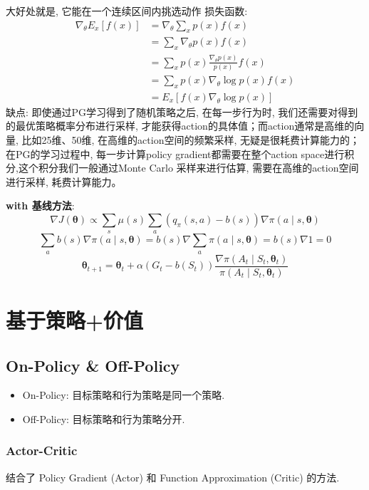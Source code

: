 \documentclass{article}
\begin{document}
        大好处就是, 它能在一个连续区间内挑选动作
        损失函数:
            \begin{align*}
                \nabla_{\theta} E_{x}[f(x)] &=\nabla_{\theta} \sum_{x} p(x) f(x) \\
                &=\sum_{x} \nabla_{\theta} p(x) f(x) \\
                &=\sum_{x} p(x) \frac{\nabla_{\theta} p(x)}{p(x)} f(x) \\
                &=\sum_{x} p(x) \nabla_{\theta} \log p(x) f(x) \\
                &=E_{x}\left[f(x) \nabla_{\theta} \log p(x)\right]
            \end{align*}
        缺点:
            即使通过PG学习得到了随机策略之后, 在每一步行为时, 我们还需要对得到的最优策略概率分布进行采样, 才能获得action的具体值；而action通常是高维的向量, 比如25维、50维, 在高维的action空间的频繁采样, 无疑是很耗费计算能力的；\\
            在PG的学习过程中, 每一步计算policy gradient都需要在整个action space进行积分,这个积分我们一般通过Monte Carlo 采样来进行估算, 需要在高维的action空间进行采样, 耗费计算能力。
            
        \textbf{with 基线方法}:
            $$\nabla J(\boldsymbol{\theta}) \propto \sum_{s} \mu(s) \sum_{a}\left(q_{\pi}(s, a)-b(s)\right) \nabla \pi(a \mid s, \boldsymbol{\theta})$$
            $$\sum_{a} b(s) \nabla \pi(a \mid s, \boldsymbol{\theta})=b(s) \nabla \sum_{a} \pi(a \mid s, \boldsymbol{\theta})=b(s) \nabla 1=0$$
            $$\boldsymbol{\theta}_{t+1} = \boldsymbol{\theta}_{t}+\alpha\left(G_{t}-b\left(S_{t}\right)\right) \frac{\nabla \pi\left(A_{t} \mid S_{t}, \boldsymbol{\theta}_{t}\right)}{\pi\left(A_{t} \mid S_{t}, \boldsymbol{\theta}_{t}\right)}$$


\section{基于策略+价值}
        \subsection{On-Policy \& Off-Policy}
            \begin{itemize}
                \item On-Policy: 目标策略和行为策略是同一个策略.
                \item Off-Policy: 目标策略和行为策略分开.
            \end{itemize}
        \subsubsection{Actor-Critic}
            结合了 Policy Gradient (Actor) 和 Function Approximation (Critic) 的方法. 
        
\end{document}

